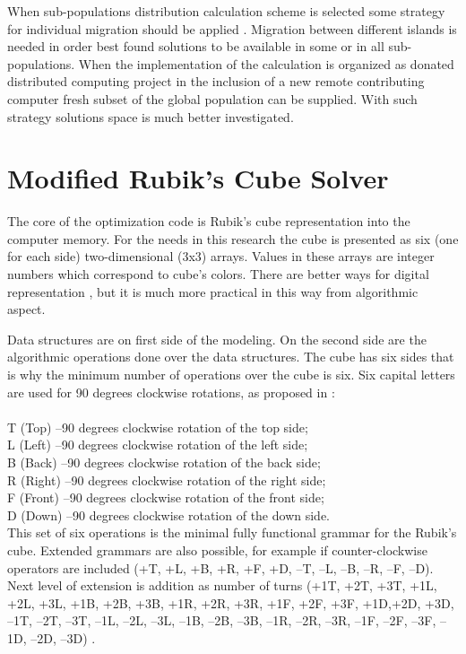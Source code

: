 \documentclass[runningheads]{llncs}
\begin{document}
When sub-populations distribution calculation scheme is selected some strategy for individual migration should be applied \cite{balabanov02}. Migration between different islands is needed in order best found solutions to be available in some or in all sub-populations. When the implementation of the calculation is organized as donated distributed computing project in the inclusion of a new remote contributing computer fresh subset of the global population can be supplied. With such strategy solutions space is much better investigated. 

\section{Modified Rubik's Cube Solver}

The core of the optimization code is Rubik's cube representation into the computer memory. For the needs in this research the cube is presented as six (one for each side) two-dimensional (3x3) arrays. Values in these arrays are integer numbers which correspond to cube's colors. There are better ways for digital representation \cite{korf01}, but it is much more practical in this way from algorithmic aspect. 

Data structures are on first side of the modeling. On the second side are the algorithmic operations done over the data structures. The cube has six sides that is why the minimum number of operations over the cube is six. Six capital letters are used for 90 degrees clockwise rotations, as proposed in \cite{randall01,balabanov02}: \\ 
\\
T (Top) –90 degrees clockwise rotation of the top side; \\ 
L (Left) –90 degrees clockwise rotation of the left side; \\ 
B (Back) –90 degrees clockwise rotation of the back side; \\ 
R (Right) –90 degrees clockwise rotation of the right side; \\ 
F (Front) –90 degrees clockwise rotation of the front side; \\ 
D (Down) –90 degrees clockwise rotation of the down side. \\ 

This set of six operations is the minimal fully functional grammar for the Rubik's cube. Extended grammars are also possible, for example if counter-clockwise operators are included (+T, +L, +B, +R, +F, +D, –T, –L, –B, –R, –F, –D). Next level of extension is addition as number of turns (+1T, +2T, +3T, +1L, +2L, +3L, +1B, +2B, +3B, +1R, +2R, +3R, +1F, +2F, +3F, +1D,+2D, +3D, –1T, –2T, –3T, –1L, –2L, –3L, –1B, –2B, –3B, –1R, –2R, –3R, –1F, –2F, –3F, –1D, –2D, –3D) \cite{balabanov02}.
\end{document}
